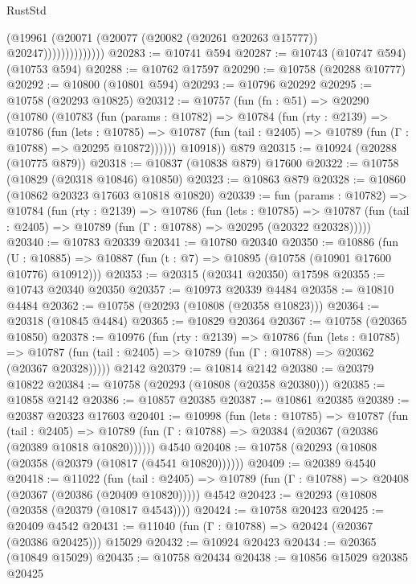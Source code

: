 \begin{lexlean}{RustStd}
\begin{coremodule}
                          (@19961
                            (@20071 (@20077 (@20082 (@20261 @20263 @15777)) @20247))))))))))))))
@20283 := @10741 @594
@20287 := @10743 (@10747 @594) (@10753 @594)
@20288 := @10762 @17597
@20290 := @10758 (@20288 @10777)
@20292 := @10800 (@10801 @594)
@20293 := @10796 @20292
@20295 := @10758 (@20293 @10825)
@20312 := @10757
    (fun (fn : @51) =>
    @20290
      (@10780
        (@10783
          (fun (params : @10782) =>
          @10784
            (fun (rty : @2139) =>
            @10786
              (fun (lets : @10785) =>
              @10787 (fun (tail : @2405) => @10789 (fun (Γ : @10788) => @20295 @10872))))))
        @10918))
    @879
@20315 := @10924 (@20288 (@10775 @879))
@20318 := @10837 (@10838 @879) @17600
@20322 := @10758 (@10829 (@20318 @10846) @10850)
@20323 := @10863 @879
@20328 := @10860 (@10862 @20323 @17603 @10818 @10820)
@20339 := fun (params : @10782) =>
  @10784
    (fun (rty : @2139) =>
    @10786
      (fun (lets : @10785) =>
      @10787 (fun (tail : @2405) => @10789 (fun (Γ : @10788) => @20295 (@20322 @20328)))))
@20340 := @10783 @20339
@20341 := @10780 @20340
@20350 := @10886
    (fun (U : @10885) => @10887 (fun (t : @7) => @10895 (@10758 (@10901 @17600 @10776) @10912)))
@20353 := @20315 (@20341 @20350) @17598
@20355 := @10743 @20340 @20350
@20357 := @10973 @20339 @4484
@20358 := @10810 @4484
@20362 := @10758 (@20293 (@10808 (@20358 @10823)))
@20364 := @20318 (@10845 @4484)
@20365 := @10829 @20364
@20367 := @10758 (@20365 @10850)
@20378 := @10976
    (fun (rty : @2139) =>
    @10786
      (fun (lets : @10785) =>
      @10787 (fun (tail : @2405) => @10789 (fun (Γ : @10788) => @20362 (@20367 @20328)))))
    @2142
@20379 := @10814 @2142
@20380 := @20379 @10822
@20384 := @10758 (@20293 (@10808 (@20358 @20380)))
@20385 := @10858 @2142
@20386 := @10857 @20385
@20387 := @10861 @20385
@20389 := @20387 @20323 @17603
@20401 := @10998
    (fun (lets : @10785) =>
    @10787
      (fun (tail : @2405) =>
      @10789 (fun (Γ : @10788) => @20384 (@20367 (@20386 (@20389 @10818 @10820))))))
    @4540
@20408 := @10758 (@20293 (@10808 (@20358 (@20379 (@10817 (@4541 @10820))))))
@20409 := @20389 @4540
@20418 := @11022
    (fun (tail : @2405) => @10789 (fun (Γ : @10788) => @20408 (@20367 (@20386 (@20409 @10820)))))
    @4542
@20423 := @20293 (@10808 (@20358 (@20379 (@10817 @4543))))
@20424 := @10758 @20423
@20425 := @20409 @4542
@20431 := @11040 (fun (Γ : @10788) => @20424 (@20367 (@20386 @20425))) @15029
@20432 := @10924 @20423
@20434 := @20365 (@10849 @15029)
@20435 := @10758 @20434
@20438 := @10856 @15029 @20385 @20425

\end{coremodule}
\end{lexlean}
